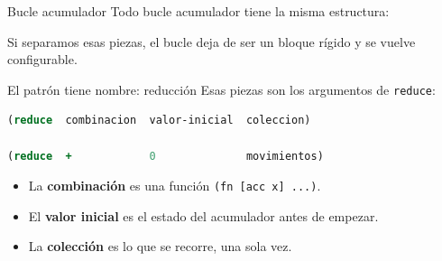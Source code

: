 \documentclass{beamer}
\begin{document}
\begin{frame}{Bucle acumulador}
    Todo bucle acumulador tiene la misma estructura:

    \vspace{0.3cm}
    \begin{center}
    \end{center}

    \vspace{0.2cm}
    Si separamos esas piezas, el bucle deja de ser un bloque rígido y se vuelve configurable.
\end{frame}

\begin{frame}[fragile]{El patrón tiene nombre: reducción}
    Esas piezas son los argumentos de \texttt{reduce}:

    \vspace{0.3cm}
    \begin{lstlisting}[language=Clojure]
(reduce  combinacion  valor-inicial  coleccion)

(reduce  +            0              movimientos)
    \end{lstlisting}

    \vspace{0.3cm}
    \begin{itemize}
        \item La \textbf{combinación} es una función \texttt{(fn [acc x] ...)}.
        \item El \textbf{valor inicial} es el estado del acumulador antes de empezar.
        \item La \textbf{colección} es lo que se recorre, una sola vez.
    \end{itemize}
\end{frame}
\end{document}
